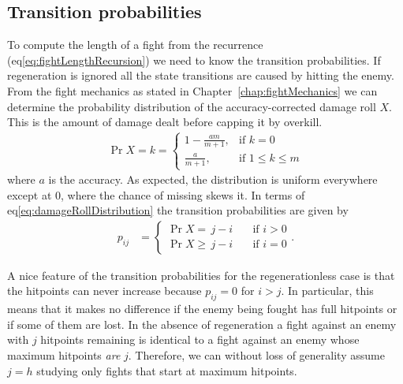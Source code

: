 \subsection{Transition probabilities}
To compute the length of a fight from the recurrence (eq\ref{eq:fightLengthRecursion}) we need to know the transition probabilities. If regeneration is ignored all the state transitions are caused by hitting the enemy. From the fight mechanics as stated in Chapter~\ref{chap:fightMechanics} we can determine the probability distribution of the accuracy-corrected damage roll $X$. This is the amount of damage dealt before capping it by overkill.
\begin{align}
	\Pr{X = k} =
	\begin{cases}
		1 - \frac{am}{m+1}, &\mbox{if } k = 0 \\
		\frac{a}{m+1},      &\mbox{if }1 \leq k \leq m
	\end{cases}\label{eq:damageRollDistribution}
\end{align}
where $a$ is the accuracy. As expected, the distribution is uniform everywhere except at 0, where the chance of missing skews it. In terms of eq\ref{eq:damageRollDistribution} the transition probabilities are given by
\begin{align}
    p_{ij}
         &= \begin{cases}
            \Pr{X=\,j-i} \quad &\mbox{if } i > 0 \\
            \Pr{X\geq\,j-i} \quad &\mbox{if } i = 0
        \end{cases}\label{eq:noregenProb}.
\end{align}

A nice feature of the transition probabilities for the regenerationless case is that the hitpoints can never increase because $p_{ij} = 0$ for $i > j$. In particular, this means that it makes no difference if the enemy being fought has full hitpoints or if some of them are lost. In the absence of regeneration a fight against an enemy with $j$ hitpoints remaining is identical to a fight against an enemy whose maximum hitpoints \emph{are} $j$. Therefore, we can without loss of generality assume $j=h$ studying only fights that start at maximum hitpoints.

